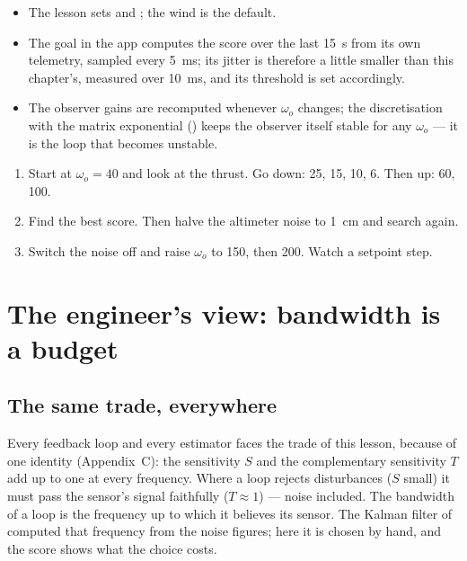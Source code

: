\begin{inapp}
\begin{itemize}[leftmargin=1.2em]
  \item The lesson sets  and ; the wind is the default.
  \item The goal in the app computes the score over the last \SI{15}{s} from its own telemetry, sampled every \SI{5}{ms}; its jitter is therefore a little smaller than this chapter's, measured over \SI{10}{ms}, and its threshold is set accordingly.
  \item The observer gains are recomputed whenever $\omega_o$ changes; the discretisation with the matrix exponential () keeps the observer itself stable for any $\omega_o$ — it is the loop that becomes unstable.
\end{itemize}
\end{inapp}

\begin{trythis}
\begin{enumerate}
  \item Start at $\omega_o = 40$ and look at the thrust. Go down: 25, 15, 10, 6. Then up: 60, 100.
  \item Find the best score. Then halve the altimeter noise to \SI{1}{cm} and search again.
  \item Switch the noise off and raise $\omega_o$ to 150, then 200. Watch a setpoint step.
\end{enumerate}
\end{trythis}

\section{The engineer's view: bandwidth is a budget}

\subsection{The same trade, everywhere}
Every feedback loop and every estimator faces the trade of this lesson, because of one identity (Appendix~C): the sensitivity $S$ and the complementary sensitivity $T$ add up to one at every frequency. Where a loop rejects disturbances ($S$ small) it must pass the sensor's signal faithfully ($T \approx 1$) — noise included. The bandwidth of a loop is the frequency up to which it believes its sensor. The Kalman filter of  computed that frequency from the noise figures; here it is chosen by hand, and the score shows what the choice costs.

